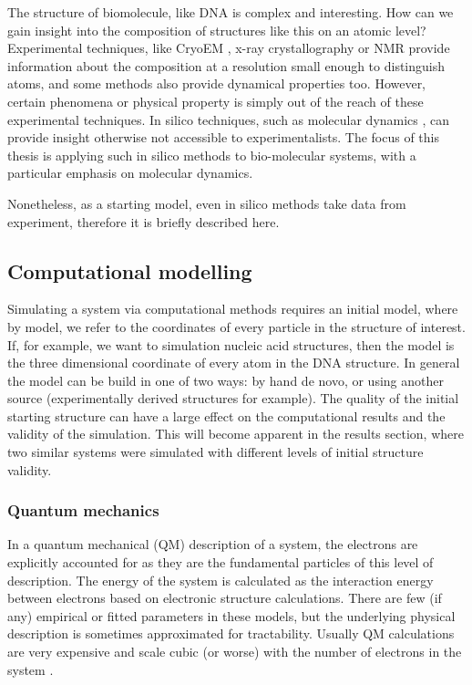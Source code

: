 \documentclass[11pt, a4paper]{report}
\begin{document}
The structure of biomolecule, like DNA is complex and interesting. How can we gain insight into the  composition of structures like this on an atomic level? Experimental techniques, like CryoEM \cite{bai2012cryo}, x-ray crystallography or NMR provide information about the composition at a resolution small enough to distinguish atoms, and some methods also provide dynamical properties too. However, certain phenomena or physical property is simply out of the reach of these experimental techniques. In silico techniques, such as molecular dynamics \cite{cheatham1995molecular}, can provide insight otherwise not accessible to experimentalists. The focus of this thesis is applying such in silico methods to bio-molecular systems, with a particular emphasis on molecular dynamics. 

Nonetheless, as a starting model, even in silico methods take data from experiment, therefore it is briefly described here.



\subsection{Computational modelling}

Simulating a system via computational methods requires an initial model, where by model, we refer to the coordinates of every particle in the structure of interest. If, for example, we want to simulation nucleic acid structures, then the model is the three dimensional coordinate of every atom in the DNA structure. In general the model can be build in one of two ways: by hand de novo, or using another source (experimentally derived structures for example). The quality of the initial starting structure can have a large effect on the computational results and the validity of the simulation. This will become apparent in the results section, where two similar systems were simulated with different levels of initial structure validity.   

\subsubsection{Quantum mechanics}

In a quantum mechanical (QM) description of a system, the electrons are explicitly accounted for as they are the fundamental particles of this level of description. The energy of the system is calculated as the interaction energy between electrons based on electronic structure calculations. There are few (if any) empirical or fitted parameters in these models, but the underlying physical description is sometimes approximated for tractability. Usually QM calculations are very expensive and scale cubic (or worse) with the number of electrons in the system \cite{vsponer1996hydrogen}.
\end{document}
